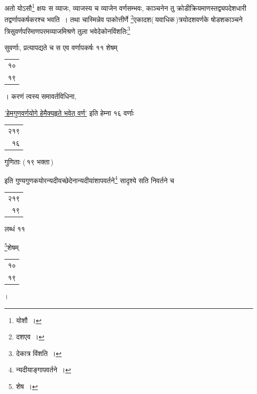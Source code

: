 \documentclass[10pt, openany]{book}
\begin{document}
{{{\vspace{0.3cm}{कथं पुनरिदं निर्णेतव्यं यस्मिन् क्षयेऽयं वर्णक इति, उच्यते, अदाहं
काञ्चनमाचक्षते}
{अतो योऽसौ\renewcommand{\thefootnote}{\s २}\footnote{\s योशौ~।} क्षयः स व्याजः, व्याजस्य च व्याजेन वर्णसम्भवः, काञ्चनेन
तु क्रोडीक्रियमाणस्तद्व्यपदेशधारी तद्वर्णापकर्षकरश्च भवति~। तथा चास्मिन्नेव पाकोत्तीर्णे
\renewcommand{\thefootnote}{\s ३}\footnote{\s *दशएव~।}एकादश(\,यवाधिक\,)त्रयोदशवर्णके षोडशकाञ्चने त्रिसुवर्णपरिमाणपरमव्याजमिश्रणे तुला
भवेदेकोनविंशतिः\renewcommand{\thefootnote}{\s ४}\footnote{\s *देकात्र विंशति~।}}
{सुवर्णाः, प्रत्यापद्यते च स एव वर्णापकर्षः ११ शेषम्\begin{tabular}{r}१०\\१९\end{tabular}। करणं त्वस्य
समावर्तविधिना,}
{\hyperref[52]{'हेमगुणवर्णयोगे हेमैक्यहृते भवेत् वर्ण'} इति हेम्ना १६ वर्णाः\begin{tabular}{r}२१९\\१६\end{tabular}गुणिताः (\,१९ भक्ता\,)}
{इति गुण्यगुणकयोरन्यदीयच्छेदेनान्यदीयांशापवर्तने\renewcommand{\thefootnote}{\s ५}\footnote{\s *न्यदीयाङ्गापवर्तने~।} सादृश्ये सति
निवर्तने च\begin{tabular}{r}२१९\\१९\end{tabular}लब्धं ११}
{\renewcommand{\thefootnote}{\s ६}\footnote{\s शेष~।}शेषम्\begin{tabular}{r}१०\\१९\end{tabular}।}

}}}
\end{document}
